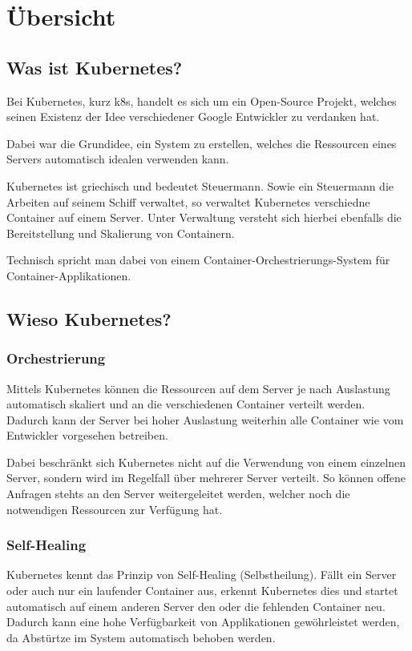 \section{Übersicht}
\subsection{Was ist Kubernetes?}
Bei Kubernetes, kurz k8s, handelt es sich um ein Open-Source Projekt, welches seinen Existenz der Idee verschiedener Google Entwickler zu verdanken hat.

Dabei war die Grundidee, ein System zu erstellen, welches die Ressourcen eines Servers automatisch idealen verwenden kann.\cite{redhat:kubernetes}

Kubernetes ist griechisch und bedeutet Steuermann. Sowie ein Steuermann die Arbeiten auf seinem Schiff verwaltet, so verwaltet Kubernetes verschiedne Container auf einem Server. Unter Verwaltung versteht sich hierbei ebenfalls die Bereitstellung und Skalierung von Containern. \cite{syseleven:kubernetes}

Technisch spricht man dabei von einem Container-Orchestrierungs-System für Container-Applikationen.

\subsection{Wieso Kubernetes?}
\subsubsection{Orchestrierung}
Mittels Kubernetes können die Ressourcen auf dem Server je nach Auslastung automatisch skaliert und an die verschiedenen Container verteilt werden. Dadurch kann der Server bei hoher Auslastung weiterhin alle Container wie vom Entwickler vorgesehen betreiben.

Dabei beschränkt sich Kubernetes nicht auf die Verwendung von einem einzelnen Server, sondern wird im Regelfall über mehrerer Server verteilt. So können offene Anfragen stehts an den Server weitergeleitet werden, welcher noch die notwendigen Ressourcen zur Verfügung hat.

\subsubsection{Self-Healing}
Kubernetes kennt das Prinzip von Self-Healing (Selbstheilung). Fällt ein Server oder auch nur ein laufender Container aus, erkennt Kubernetes dies und startet automatisch auf einem anderen Server den oder die fehlenden Container neu. Dadurch kann eine hohe Verfügbarkeit von Applikationen gewöhrleistet werden, da Abstürtze im System automatisch behoben werden.


